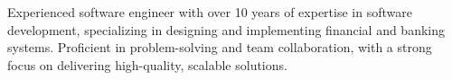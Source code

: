 

\begin{cvparagraph}

    Experienced software engineer with over 10 years of expertise in software development, specializing in designing and implementing financial and banking systems. Proficient in problem-solving and team collaboration, with a strong focus on delivering high-quality, scalable solutions.
\end{cvparagraph}
